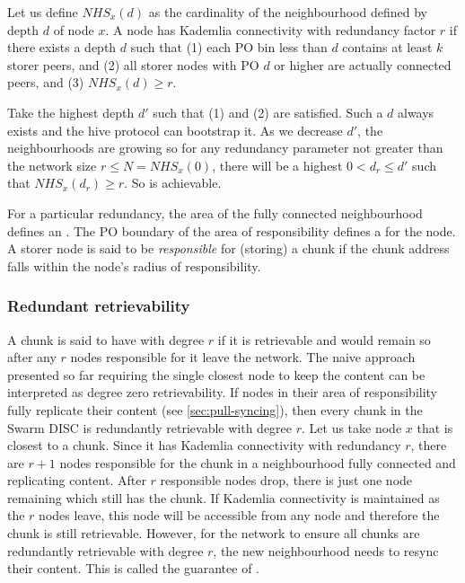 Let us define  $\mathit{NHS}_x(d)$  as the cardinality of the neighbourhood defined by depth $d$ of node $x$. 
A node has Kademlia connectivity with redundancy factor $r$ if there exists a depth $d$ such that (1) each PO bin less than $d$ contains at least $k$ storer peers, and (2) all storer nodes with PO $d$ or higher are actually connected peers, and (3) $\mathit{NHS}_x(d)\geq r$.

Take the highest depth $d'$ such that (1) and (2) are satisfied. Such a $d$ always exists and the hive protocol can bootstrap it. As we decrease $d'$, the neighbourhoods are growing so for any redundancy parameter not greater than the network size $r\leq N=\mathit{NHS}_x(0)$, there will be a highest $0<d_r\leq d'$ such that $\mathit{NHS}_x(d_r)\geq r$. So  is achievable. 



For a particular redundancy, the area of the fully connected neighbourhood defines an . The PO boundary of the area of responsibility defines a  for the node. A storer node is said to be \emph{responsible} for (storing) a chunk if the chunk address falls within the node's radius of responsibility. 

\subsubsection{Redundant retrievability}

A chunk is said to have  with degree $r$ if it is retrievable and would remain so after any $r$ nodes responsible for it leave the network. The naive approach presented so far requiring the single closest node to keep the content can be interpreted as degree zero retrievability. If nodes in their area of responsibility fully replicate their content (see \ref{sec:pull-syncing}), then every chunk in the Swarm DISC is redundantly retrievable with degree $r$. Let us take node $x$ that is closest to a chunk. Since it has Kademlia connectivity with redundancy $r$, there are $r+1$ nodes responsible for the chunk in a neighbourhood fully connected and replicating content. After $r$ responsible nodes drop, there is just one node remaining which still has the chunk. If Kademlia connectivity is maintained as the $r$ nodes leave, this node will be accessible from any node and therefore the chunk is still retrievable. However, for the network to ensure all chunks are redundantly retrievable with degree $r$, the new neighbourhood needs to resync their content. This is called the guarantee of .

